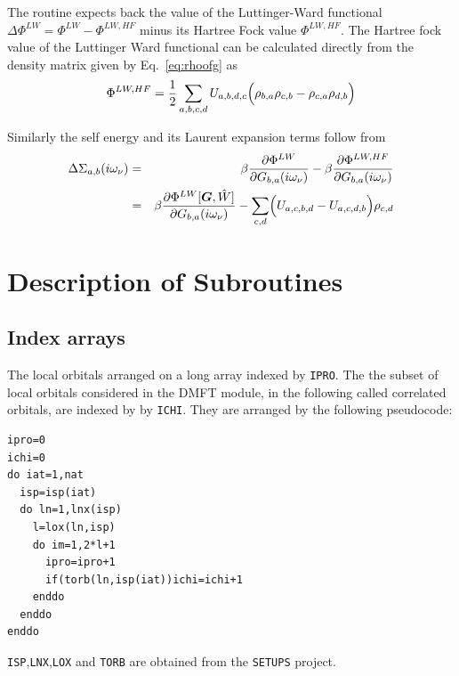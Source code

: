 \documentclass[11pt,a4paper]{report}
\newcommand{\mat}[1]{\bm{#1}}  %
\begin{document}
The routine expects back the value of the Luttinger-Ward functional
$\Delta\Phi^{LW}=\Phi^{LW}-\Phi^{LW,HF}$ minus its Hartree Fock value
$\Phi^{LW,HF}$. The Hartree fock value of the Luttinger Ward
functional can be calculated directly from the density matrix given by
Eq.~\eqref{eq:rhoofg} as
\begin{eqnarray}
\Phi^{LW,HF}=\frac{1}{2}\sum_{a,b,c,d}U_{a,b,d,c}
\Bigl(\rho_{b,a}\rho_{c,b}-\rho_{c,a}\rho_{d,b}\Bigr)
\label{eq:philwhf}
\end{eqnarray}


Similarly the self energy and its Laurent expansion terms follow from
\begin{eqnarray}
\Delta\Sigma_{a,b}(i\omega_\nu)&=&
\beta\frac{\partial\Phi^{LW}}{\partial G_{b,a}(i\omega_\nu)}
-\beta\frac{\partial\Phi^{LW,HF}}{\partial G_{b,a}(i\omega_\nu)}
\nonumber\\
&=&\beta\frac{\partial\Phi^{LW}[\mat{G},\hat{W}]}{\partial G_{b,a}(i\omega_\nu)}
-\sum_{c,d}\Bigl(U_{a,c,b,d}-U_{a,c,d,b}\Bigr)\rho_{c,d}
\end{eqnarray}



\section{Description of Subroutines}
\subsection{Index arrays}
\label{sec:indexarrays}
The local orbitals arranged on a long array indexed by \verb|IPRO|.
The the subset of local orbitals considered in the DMFT module, in the
following called correlated orbitals, are indexed by by
\verb|ICHI|. They are arranged by the following pseudocode:
\begin{verbatim}
ipro=0
ichi=0
do iat=1,nat
  isp=isp(iat)
  do ln=1,lnx(isp)
    l=lox(ln,isp)
    do im=1,2*l+1
      ipro=ipro+1
      if(torb(ln,isp(iat))ichi=ichi+1
    enddo
  enddo
enddo
\end{verbatim}
\verb|ISP|,\verb|LNX|,\verb|LOX| and \verb|TORB| are obtained from the
\verb|SETUPS| project.


\end{document}
